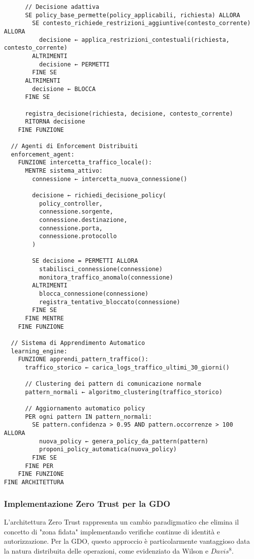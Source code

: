 {\begin{verbatim}
      // Decisione adattiva
      SE policy_base_permette(policy_applicabili, richiesta) ALLORA
        SE contesto_richiede_restrizioni_aggiuntive(contesto_corrente) ALLORA
          decisione ← applica_restrizioni_contestuali(richiesta, contesto_corrente)
        ALTRIMENTI
          decisione ← PERMETTI
        FINE SE
      ALTRIMENTI
        decisione ← BLOCCA
      FINE SE
      
      registra_decisione(richiesta, decisione, contesto_corrente)
      RITORNA decisione
    FINE FUNZIONE

  // Agenti di Enforcement Distribuiti
  enforcement_agent:
    FUNZIONE intercetta_traffico_locale():
      MENTRE sistema_attivo:
        connessione ← intercetta_nuova_connessione()
        
        decisione ← richiedi_decisione_policy(
          policy_controller,
          connessione.sorgente,
          connessione.destinazione,
          connessione.porta,
          connessione.protocollo
        )
        
        SE decisione = PERMETTI ALLORA
          stabilisci_connessione(connessione)
          monitora_traffico_anomalo(connessione)
        ALTRIMENTI
          blocca_connessione(connessione)
          registra_tentativo_bloccato(connessione)
        FINE SE
      FINE MENTRE
    FINE FUNZIONE

  // Sistema di Apprendimento Automatico
  learning_engine:
    FUNZIONE apprendi_pattern_traffico():
      traffico_storico ← carica_logs_traffico_ultimi_30_giorni()
      
      // Clustering dei pattern di comunicazione normale
      pattern_normali ← algoritmo_clustering(traffico_storico)
      
      // Aggiornamento automatico policy
      PER ogni pattern IN pattern_normali:
        SE pattern.confidenza > 0.95 AND pattern.occorrenze > 100 ALLORA
          nuova_policy ← genera_policy_da_pattern(pattern)
          proponi_policy_automatica(nuova_policy)
        FINE SE
      FINE PER
    FINE FUNZIONE
FINE ARCHITETTURA
\end{verbatim}

\subsubsection{Implementazione Zero Trust per la GDO}

L'architettura Zero Trust rappresenta un cambio paradigmatico che elimina il concetto di "zona fidata" implementando verifiche continue di identità e autorizzazione. Per la GDO, questo approccio è particolarmente vantaggioso data la natura distribuita delle operazioni, come evidenziato da Wilson e $Davis$$^{8}$.

}
